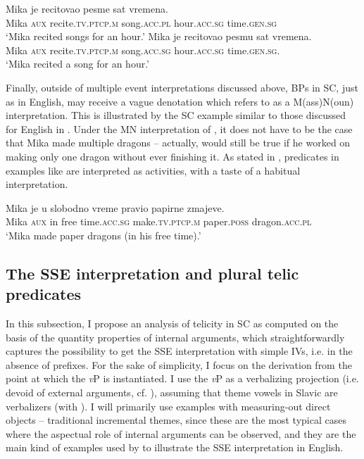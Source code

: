 \documentclass[output=paper,colorlinks,citecolor=brown]{langscibook}
\begin{document}
\ea \label{mil:ex:SSE-intro-repetead}
\gll Mika   je  recitovao   pesme sat vremena. \\ Mika \textsc{aux} recite.\textsc{tv.ptcp.m} song.\textsc{acc.pl} hour.\textsc{acc.sg} time.\textsc{gen.sg}  \\
\glt `Mika recited songs for an hour.'
\ex \label{mil:ex:SIE-SC-1-nesto}
\gll Mika   je  recitovao   pesmu   sat vremena. \\
     Mika \textsc{aux} recite.\textsc{tv.ptcp.m} song.\textsc{acc.sg} hour.\textsc{acc.sg} time.\textsc{gen.sg.} \\ 
\glt `Mika recited a song for an hour.'
\z

\noindent Finally, outside of multiple event interpretations discussed above, BPs in SC, just as in English, may receive a vague denotation which \citet[46, 147]{MacDonald_2008} refers to as a M(ass)N(oun) interpretation. This is illustrated by the SC example  similar to those discussed for English in \citet[46]{MacDonald_2008}. Under the MN interpretation of , it does not have to be the case that Mika made multiple dragons -- actually,  would still be true if he worked on making only one dragon without ever finishing it. As stated in \citet[46]{MacDonald_2008}, predicates in examples like  are interpreted as activities, with a taste of a habitual interpretation.

\ea \label{mil:ex:BPs-massInterpretation}
\gll Mika je u slobodno vreme pravio papirne zmajeve.
\\ Mika \textsc{aux} in free time.\textsc{acc.sg} make.\textsc{tv.ptcp.m} paper.\textsc{poss} dragon.\textsc{acc.pl} 
     \\
\glt  ‘Mika made paper dragons (in his free time).’
\z


\subsection{The SSE interpretation and plural telic predicates} \label{mil:sec:SSE-interpretation}\largerpage

In this subsection, I propose an analysis of telicity in SC as computed on the basis of the quantity properties of internal arguments, which straightforwardly captures the possibility to get the SSE interpretation with simple IVs, i.e. in the absence of prefixes. For the sake of simplicity, I focus on the derivation from the point at which the \textit{v}P is instantiated. I use the \textit{v}P as a verbalizing projection (i.e. devoid of external arguments, cf. \citealt{Harley2013}), assuming that theme vowels in Slavic are verbalizers (with \citealt{Svenonius2004a, Biskup2019, Kovačevićetal2021, MilosavljevićArsenijević2021}). I will primarily use examples with measuring-out direct objects -- traditional incremental themes, since these are the most typical cases where the aspectual role of internal arguments can be observed, and they are the main kind of examples used by \citet{MacDonald_2008} to illustrate the SSE interpretation in English.\largerpage
\end{document}
